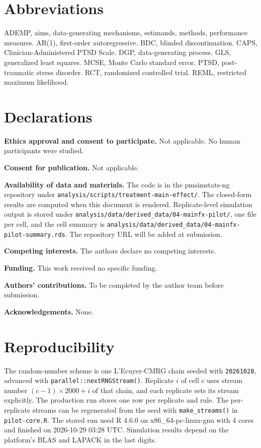 \documentclass[
  11pt,
]{article}
\begin{document}
\section{Abbreviations}\label{abbreviations}

ADEMP, aims, data-generating mechanisms, estimands, methods, performance measures. AR(1), first-order autoregressive. BDC, blinded discontinuation. CAPS, Clinician-Administered PTSD Scale. DGP, data-generating process. GLS, generalized least squares. MCSE, Monte Carlo standard error. PTSD, post-traumatic stress disorder. RCT, randomized controlled trial. REML, restricted maximum likelihood.

\section{Declarations}\label{declarations}

\textbf{Ethics approval and consent to participate.} Not applicable. No human participants were studied.

\textbf{Consent for publication.} Not applicable.

\textbf{Availability of data and materials.} The code is in the pmsimstats-ng repository under \texttt{analysis/scripts/treatment-main-effect/}. The closed-form results are computed when this document is rendered. Replicate-level simulation output is stored under \texttt{analysis/data/derived\_data/04-mainfx-pilot/}, one file per cell, and the cell summary is \texttt{analysis/data/derived\_data/04-mainfx-pilot-summary.rds}. The repository URL will be added at submission.

\textbf{Competing interests.} The authors declare no competing interests.

\textbf{Funding.} This work received no specific funding.

\textbf{Authors' contributions.} To be completed by the author team before submission.

\textbf{Acknowledgements.} None.

\section{Reproducibility}\label{reproducibility}

The random-number scheme is one L'Ecuyer-CMRG chain seeded with \texttt{20261028}, advanced with \texttt{parallel::nextRNGStream()}. Replicate \(i\) of cell \(c\) uses stream number \((c-1) \times 2000 + i\) of that chain, and each replicate sets its stream explicitly. The production run stores one row per replicate and rule. The per-replicate streams can be regenerated from the seed with \texttt{make\_streams()} in \texttt{pilot-core.R}. The stored run used R 4.6.0 on x86\_64-pc-linux-gnu with 4 cores and finished on 2026-10-29 03:28 UTC. Simulation results depend on the platform's BLAS and LAPACK in the last digits.
\end{document}
